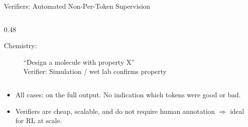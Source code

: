 \begin{frame}{Verifiers: Automated Non-Per-Token Supervision}
\begin{columns}[T]
\begin{column}{0.48\textwidth}
\begin{description}
        \item[Chemistry:] ``Design a molecule with property X''\\
          Verifier: Simulation / wet lab confirms property
      \end{description}

    \end{column}
  \end{columns}

  \vspace{0.3em}
  \begin{tcolorbox}[colback=blue!5, colframe=blue!40, boxrule=0.5pt, arc=2pt, left=4pt, right=4pt, top=2pt, bottom=2pt]
    \begin{itemize}[nosep]
      \item All cases:  on the full output. No indication which tokens were good or bad.
      \item Verifiers are cheap, scalable, and do not require human annotation $\Rightarrow$ ideal for RL at scale.
    \end{itemize}
  \end{tcolorbox}
\end{frame}

